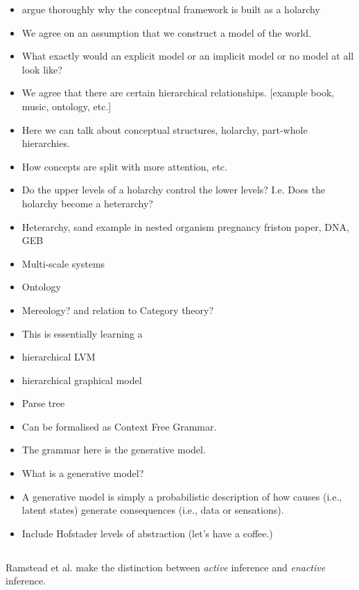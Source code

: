 \begin{itemize}
    \item argue thoroughly why the conceptual framework is built as a holarchy
    \item We agree on an assumption that we construct a model of the world.
    \item What exactly would an explicit model or an implicit model or no model at all look like?
    \item We agree that there are certain hierarchical relationships. [example book, music, ontology, etc.]
    \item Here we can talk about conceptual structures, holarchy, part-whole hierarchies. 
    \item How concepts are split with more attention, etc. 
    \item Do the upper levels of a holarchy control the lower levels? I.e. Does the holarchy become a heterarchy?
    \item Heterarchy, sand example in nested organism pregnancy friston paper, DNA, GEB
    \item Multi-scale systems
    \item Ontology
    \item Mereology? and relation to Category theory?
    \item This is essentially learning a 
        \item hierarchical LVM
        \item hierarchical graphical model
        \item Parse tree
        \item Can be formalised as Context Free Grammar. 
        \item The grammar here is the generative model. 
        \item What is a generative model?
        \item A generative model is simply a probabilistic description of how causes (i.e., latent states) generate consequences (i.e., data or sensations). \cite{friston_world_2021}
    \item Include Hofstader levels of abstraction (let's have a coffee.)
\end{itemize}





\subsection{}
\cite{Ramstead_Kirchhoff_Friston_2020}
Ramstead et al. make the distinction between \emph{active} inference and \emph{enactive} inference. 

